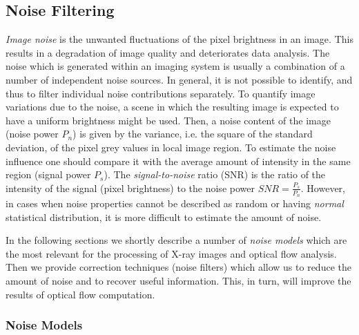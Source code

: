  


\subsection{Noise Filtering}
\label{noise_filtering}

\textit{Image noise} is the unwanted fluctuations of the pixel brightness in an image. This results in a degradation of image quality and deteriorates data analysis.  The noise which is generated within an imaging system is usually a combination of a number of independent noise
sources. In general, it is not possible to identify, and thus to filter individual noise contributions separately. To quantify image variations due to the noise, a scene in which the resulting image is expected to have a uniform brightness might be used. Then, a noise content of the image (noise power $P_n$) is given by the variance, i.e. the square of the standard deviation, of the pixel grey values in local image region. To estimate the noise influence one should compare it with the average amount of intensity in the same region (signal power $P_s$).  The \textit{signal-to-noise} ratio (SNR) is the ratio of the intensity of the signal (pixel brightness) to the noise power $SNR = \frac{P_s}{P_n}$. However, in cases when noise properties cannot be described as random or having \textit{normal} statistical distribution, it is more difficult to estimate the amount of noise. 

In the following sections we shortly describe a number of \textit{noise models} which are the most relevant for the processing of X-ray images and optical flow analysis. Then we provide correction techniques (noise filters) which allow us to reduce the amount of noise and to recover useful information. This, in turn, will improve the results of optical flow computation.   




\subsubsection{Noise Models}
\label{noise_models}

